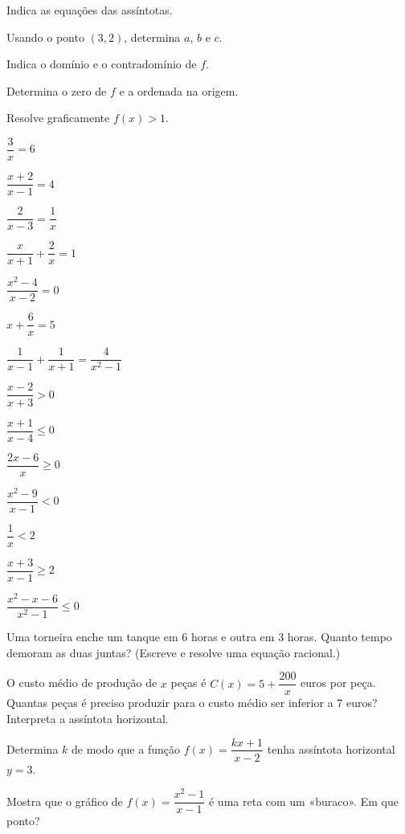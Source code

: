 \documentclass[12pt]{article}
\begin{document}
\begin{exercicios}
  \item Indica as equações das assíntotas.
  \item Usando o ponto $(3, 2)$, determina $a$, $b$ e $c$.
  \item Indica o domínio e o contradomínio de $f$.
  \item Determina o zero de $f$ e a ordenada na origem.
  \item Resolve graficamente $f(x) > 1$.
\end{exercicios}

\begin{exercicios}
  \item $\dfrac{3}{x} = 6$
  \item $\dfrac{x + 2}{x - 1} = 4$
  \item $\dfrac{2}{x - 3} = \dfrac{1}{x}$
  \item $\dfrac{x}{x + 1} + \dfrac{2}{x} = 1$
  \item $\dfrac{x^2 - 4}{x - 2} = 0$
  \item $x + \dfrac{6}{x} = 5$
  \item $\dfrac{1}{x - 1} + \dfrac{1}{x + 1} = \dfrac{4}{x^2 - 1}$
\end{exercicios}

\begin{exercicios}
  \item $\dfrac{x - 2}{x + 3} > 0$
  \item $\dfrac{x + 1}{x - 4} \le 0$
  \item $\dfrac{2x - 6}{x} \ge 0$
  \item $\dfrac{x^2 - 9}{x - 1} < 0$
  \item $\dfrac{1}{x} < 2$
  \item $\dfrac{x + 3}{x - 1} \ge 2$
  \item $\dfrac{x^2 - x - 6}{x^2 - 1} \le 0$
\end{exercicios}

\begin{exercicios}
  \item Uma torneira enche um tanque em 6 horas e outra em 3 horas. Quanto tempo demoram as duas juntas? (Escreve e resolve uma equação racional.)
  \item O custo médio de produção de $x$ peças é $C(x) = 5 + \dfrac{200}{x}$ euros por peça. Quantas peças é preciso produzir para o custo médio ser inferior a 7 euros? Interpreta a assíntota horizontal.
  \item Determina $k$ de modo que a função $f(x) = \dfrac{kx + 1}{x - 2}$ tenha assíntota horizontal $y = 3$.
  \item Mostra que o gráfico de $f(x) = \dfrac{x^2 - 1}{x - 1}$ é uma reta com um «buraco». Em que ponto?
\end{exercicios}
\end{document}
